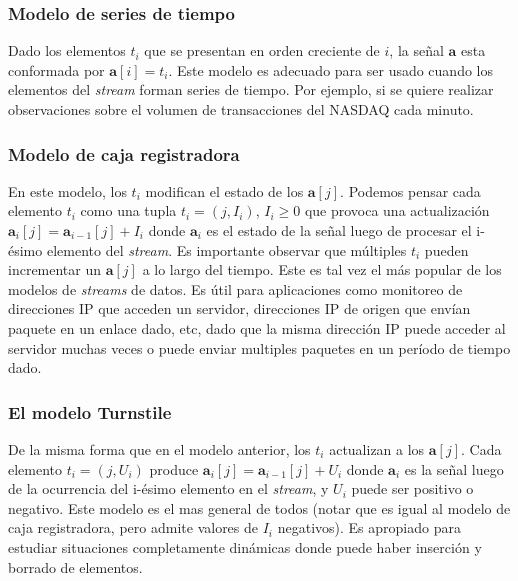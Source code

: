 \documentclass[a4paper,10pt, oneside]{article}
\begin{document}
\subsubsection{Modelo de series de tiempo}
Dado los elementos $t_i$ que se presentan en orden creciente de $i$, la señal $\mathbf{a}$ esta conformada por $\mathbf{a}[i]=t_i$. Este modelo es adecuado para ser usado cuando los elementos del \textit{stream} forman series de tiempo. Por ejemplo, si se quiere realizar observaciones sobre el volumen de transacciones del NASDAQ cada minuto.
\subsubsection{Modelo de caja registradora}
En este modelo, los $t_i$ modifican el estado de los $\textbf{a}[j]$. Podemos pensar cada elemento $t_i$ como una tupla $t_i = (j, I_i)$, $I_i \geq 0$ que provoca una actualización $\textbf{a}_i[j] = \textbf{a}_{i-1} [j] + I_i$ donde $\textbf{a}_i$ es el estado de la señal luego de procesar el i-ésimo elemento del \textit{stream}. Es importante observar que múltiples $t_i$ pueden incrementar un $\textbf{a}[j]$ a lo largo del tiempo. Este es tal vez el más popular de los modelos de \textit{streams} de datos. Es útil para aplicaciones como monitoreo de direcciones IP que acceden un servidor, direcciones IP de origen que envían paquete en un enlace dado, etc, dado que la misma dirección IP puede acceder al servidor muchas veces o puede enviar multiples paquetes en un período de tiempo dado.
\subsubsection{El modelo Turnstile}
De la misma forma que en el modelo anterior, los $t_i$ actualizan a los $\textbf{a}[j]$. Cada elemento $t_i = (j, U_i)$ produce  $\textbf{a}_i[j] = \textbf{a}_{i-1} [j] + U_i$ donde $\textbf{a}_i$ es la señal luego de la ocurrencia del i-ésimo elemento en el \textit{stream}, y $U_i$ puede ser positivo o negativo. Este modelo es el mas general de todos (notar que es igual al modelo de caja registradora, pero admite valores de $I_i$ negativos). Es apropiado para estudiar situaciones completamente dinámicas donde puede haber inserción y borrado de elementos. 

\
\end{document}
